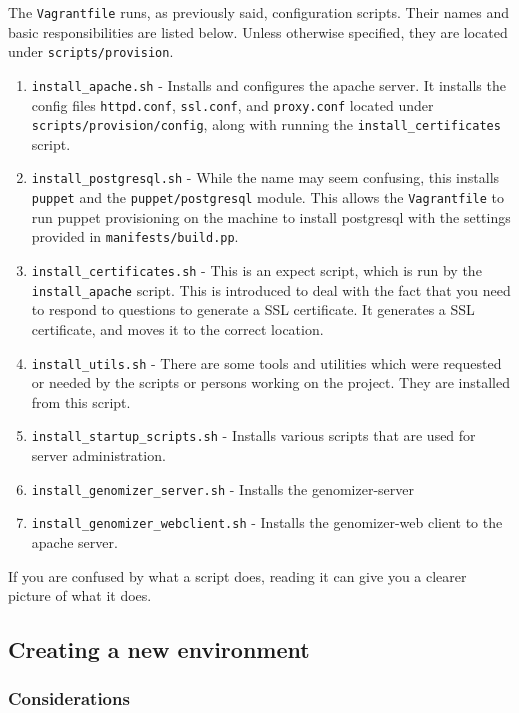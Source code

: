 The \texttt{Vagrantfile} runs, as previously said, configuration
scripts. Their names and basic responsibilities are listed below. Unless
otherwise specified, they are located under \texttt{scripts/provision}.

\begin{enumerate}
\itemsep1pt\parskip0pt
\item
  \texttt{install\_apache.sh} - Installs and configures the apache
  server. It installs the config files \texttt{httpd.conf},
  \texttt{ssl.conf}, and \texttt{proxy.conf} located under
  \texttt{scripts/provision/config}, along with running the
  \texttt{install\_certificates} script.
\item
  \texttt{install\_postgresql.sh} - While the name may seem confusing,
  this installs \texttt{puppet} and the \texttt{puppet/postgresql}
  module. This allows the \texttt{Vagrantfile} to run puppet
  provisioning on the machine to install postgresql with the settings
  provided in \texttt{manifests/build.pp}.
\item
  \texttt{install\_certificates.sh} - This is an expect script, which is
  run by the \texttt{install\_apache} script. This is introduced to deal
  with the fact that you need to respond to questions to generate a SSL
  certificate. It generates a SSL certificate, and moves it to the
  correct location.
\item
  \texttt{install\_utils.sh} - There are some tools and utilities which
  were requested or needed by the scripts or persons working on the
  project. They are installed from this script.
\item
  \texttt{install\_startup\_scripts.sh} - Installs various scripts that
  are used for server administration.
\item
  \texttt{install\_genomizer\_server.sh} - Installs the genomizer-server
\item
  \texttt{install\_genomizer\_webclient.sh} - Installs the genomizer-web
  client to the apache server.
\end{enumerate}

If you are confused by what a script does, reading it can give you a
clearer picture of what it does.

\subsection{Creating a new
environment}\label{creating-a-new-environment}

\subsubsection{Considerations}\label{considerations}

